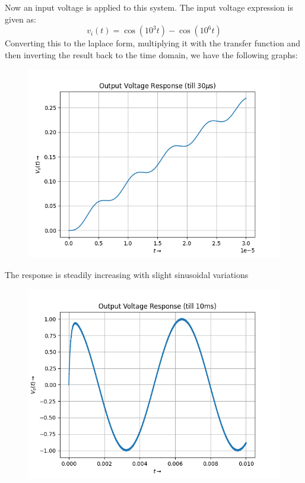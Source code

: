 \documentclass[12pt, a4paper]{article}
\begin{document}
Now an input voltage is applied to this system. The input voltage expression is given as:
\begin{equation*}
    v_{i}(t) = \cos(10^{3}t) - \cos(10^{6}t)
\end{equation*}
Converting this to the laplace form, multiplying it with the transfer function and then inverting the result back to the time domain, we have the following graphs:
\begin{figure}[H]
    \centering
    \includegraphics[scale = 0.8]{Figure_10.png}
    \label{fig:sample}
\end{figure}
\begin{center}
    The response is steadily increasing with slight sinusoidal variations
\end{center}
\vspace*{-0.5cm}
\begin{figure}[H]
    \centering
    \includegraphics[scale = 0.8]{Figure_11.png}
    \label{fig:sample}
\end{figure}
\end{document}

